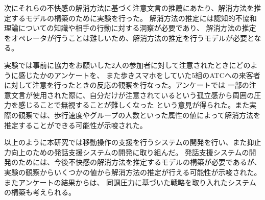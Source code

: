 \documentclass{kuisthesis}
\begin{document}
\begin{jabstract}
次にそれらの不快感の解消方法に基づく注意文言の推薦にあたり、解消方法を推定するモデルの構築のために実験を行った。
解消方法の推定には認知的不協和理論についての知識や相手の行動に対する洞察が必要であり、
解消方法の推定をオペレータが行うことは難しいため、解消方法の推定を行うモデルが必要となる。

実験では事前に協力をお願いした2人の参加者に対して注意されたときにどのように感じたかのアンケートを、
また歩きスマホをしていた5組のATCへの来客者に対して注意を行ったときの反応の観察を行なった。アンケートでは
一部の注意文言が使用された際に、自分だけが注意されているという孤立感から周囲の圧力を感じることで無視することが難しくなった
という意見が得られた。また実際の観察では、歩行速度やグループの人数といった属性の値によって解消方法を推定することができる可能性が示唆された。

以上のように本研究では移動操作の支援を行うシステムの開発を行い、また抑止力向上のための発話支援システムの開発に取り組んだ。
発話支援システムの開発のためには、今後不快感の解消方法を推定するモデルの構築が必要であるが、
実験の観察からいくつかの値から解消方法の推定が行える可能性が示唆された。またアンケートの結果からは、
同調圧力に基づいた戦略を取り入れたシステムの構築も考えられる。
\end{jabstract}
\end{document}
